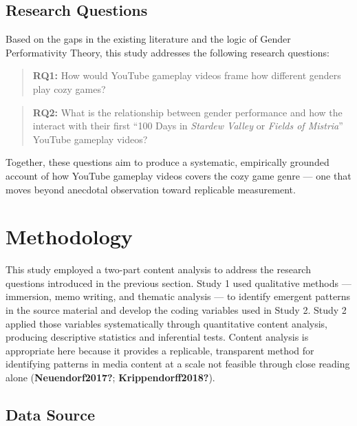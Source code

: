\documentclass[
  12pt,
  letterpaper,
  DIV=11,
  numbers=noendperiod]{scrreprt}
\begin{document}
\section{Research Questions}\label{research-questions}

Based on the gaps in the existing literature and the logic of Gender
Performativity Theory, this study addresses the following research
questions:

\begin{quote}
\textbf{RQ1:} How would YouTube gameplay videos frame how different
genders play cozy games?
\end{quote}

\begin{quote}
\textbf{RQ2:} What is the relationship between gender performance and
how the interact with their first ``100 Days in \emph{Stardew Valley} or
\emph{Fields of Mistria}'' YouTube gameplay videos?
\end{quote}

Together, these questions aim to produce a systematic, empirically
grounded account of how YouTube gameplay videos covers the cozy game
genre --- one that moves beyond anecdotal observation toward replicable
measurement.


\chapter{Methodology}\label{methodology}

This study employed a two-part content analysis to address the research
questions introduced in the previous section. Study 1 used qualitative
methods --- immersion, memo writing, and thematic analysis --- to
identify emergent patterns in the source material and develop the coding
variables used in Study 2. Study 2 applied those variables
systematically through quantitative content analysis, producing
descriptive statistics and inferential tests. Content analysis is
appropriate here because it provides a replicable, transparent method
for identifying patterns in media content at a scale not feasible
through close reading alone (\textbf{Neuendorf2017?};
\textbf{Krippendorff2018?}).

\section{Data Source}\label{data-source}
\end{document}
